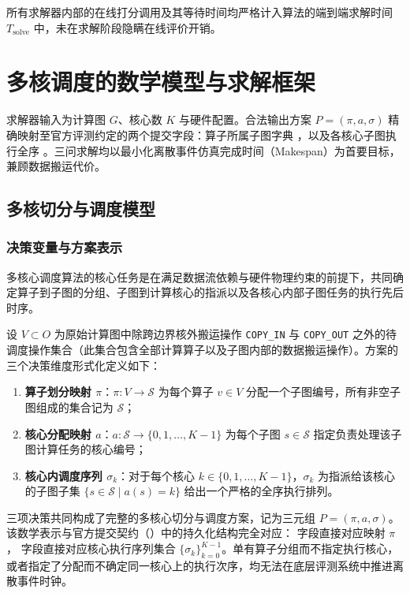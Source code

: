 \documentclass[anonymous,withtoc]{gmcm2026}
\providecommand{\tightlist}{\setlength{\itemsep}{0pt}\setlength{\parskip}{0pt}}
\begin{document}
所有求解器内部的在线打分调用及其等待时间均严格计入算法的端到端求解时间 \(T_{\text{solve}}\) 中，未在求解阶段隐瞒在线评价开销。


\section{多核调度的数学模型与求解框架}

求解器输入为计算图 \(G\)、核心数 \(K\) 与硬件配置。合法输出方案 \(P = (\pi, a, \sigma)\) 精确映射至官方评测约定的两个提交字段：算子所属子图字典 \texttt{}，以及各核心子图执行全序 \texttt{}。三问求解均以最小化离散事件仿真完成时间（Makespan）为首要目标，兼顾数据搬运代价。

\subsection{多核切分与调度模型}

\subsubsection{决策变量与方案表示}

多核心调度算法的核心任务是在满足数据流依赖与硬件物理约束的前提下，共同确定算子到子图的分组、子图到计算核心的指派以及各核心内部子图任务的执行先后时序。

设 \(V \subset O\) 为原始计算图中除跨边界核外搬运操作 \texttt{COPY\_IN} 与 \texttt{COPY\_OUT} 之外的待调度操作集合（此集合包含全部计算算子以及子图内部的数据搬运操作）。方案的三个决策维度形式化定义如下：

\begin{enumerate}
\def\labelenumi{\arabic{enumi}.}
\tightlist
\item
  \textbf{算子划分映射 \(\pi\)}：\(\pi: V \to \mathcal{S}\) 为每个算子 \(v \in V\) 分配一个子图编号，所有非空子图组成的集合记为 \(\mathcal{S}\)；
\item
  \textbf{核心分配映射 \(a\)}：\(a: \mathcal{S} \to \{0, 1, \dots, K-1\}\) 为每个子图 \(s \in \mathcal{S}\) 指定负责处理该子图计算任务的核心编号；
\item
  \textbf{核心内调度序列 \(\sigma_k\)}：对于每个核心 \(k \in \{0, 1, \dots, K-1\}\)，\(\sigma_k\) 为指派给该核心的子图子集 \(\{s \in \mathcal{S} \mid a(s) = k\}\) 给出一个严格的全序执行排列。
\end{enumerate}

三项决策共同构成了完整的多核心切分与调度方案，记为三元组 \(P = (\pi, a, \sigma)\)。该数学表示与官方提交契约（\texttt{}）中的持久化结构完全对应：\texttt{} 字段直接对应映射 \(\pi\)，\texttt{} 字段直接对应核心执行序列集合 \(\{\sigma_k\}_{k=0}^{K-1}\)。单有算子分组而不指定执行核心，或者指定了分配而不确定同一核心上的执行次序，均无法在底层评测系统中推进离散事件时钟。
\end{document}

